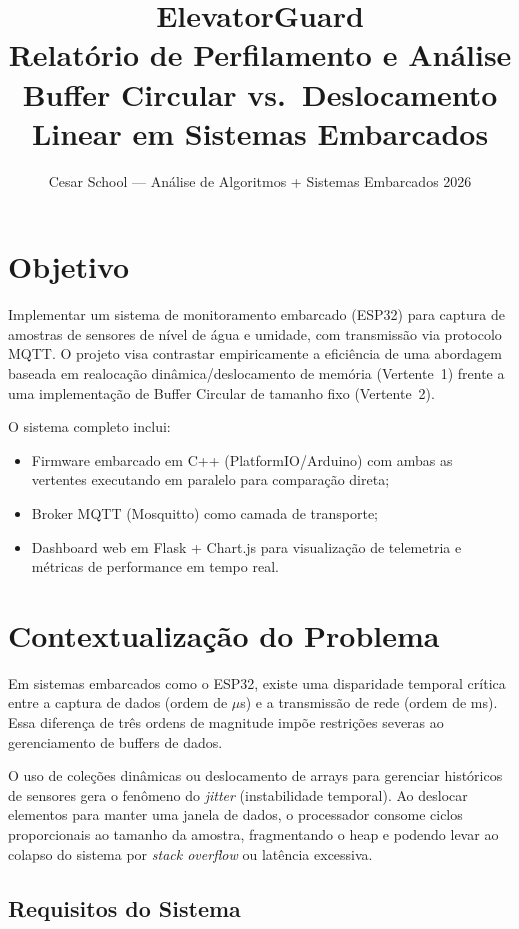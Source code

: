\documentclass[12pt, a4paper]{article}
\title{
    \textbf{ElevatorGuard} \\
    \large Relatório de Perfilamento e Análise \\
    Buffer Circular vs.\ Deslocamento Linear em Sistemas Embarcados
}
\author{
    Cesar School --- Análise de Algoritmos + Sistemas Embarcados 2026
}
\date{}
\begin{document}
\maketitle
\tableofcontents
\newpage

\section{Objetivo}

Implementar um sistema de monitoramento embarcado (ESP32) para captura de amostras de sensores de nível de água e umidade, com transmissão via protocolo MQTT. O projeto visa contrastar empiricamente a eficiência de uma abordagem baseada em realocação dinâmica/deslocamento de memória (Vertente~1) frente a uma implementação de Buffer Circular de tamanho fixo (Vertente~2).

O sistema completo inclui:
\begin{itemize}
    \item Firmware embarcado em C++ (PlatformIO/Arduino) com ambas as vertentes executando em paralelo para comparação direta;
    \item Broker MQTT (Mosquitto) como camada de transporte;
    \item Dashboard web em Flask + Chart.js para visualização de telemetria e métricas de performance em tempo real.
\end{itemize}

\section{Contextualização do Problema}

Em sistemas embarcados como o ESP32, existe uma disparidade temporal crítica entre a captura de dados (ordem de $\mu$s) e a transmissão de rede (ordem de ms). Essa diferença de três ordens de magnitude impõe restrições severas ao gerenciamento de buffers de dados.

O uso de coleções dinâmicas ou deslocamento de arrays para gerenciar históricos de sensores gera o fenômeno do \textit{jitter} (instabilidade temporal). Ao deslocar elementos para manter uma janela de dados, o processador consome ciclos proporcionais ao tamanho da amostra, fragmentando o heap e podendo levar ao colapso do sistema por \textit{stack overflow} ou latência excessiva.

\subsection{Requisitos do Sistema}
\end{document}
